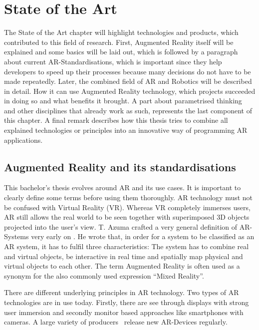 \chapter{State of the Art}\label{Chap:StateOfTheArt}

The State of the Art chapter will highlight technologies and products, which contributed to this field of research. First, Augmented Reality itself will be explained and some basics will be laid out, which is followed by a paragraph about current AR-Standardisations, which is important since they help developers to speed up their processes because many decisions do not have to be made repeatedly. Later, the combined field of AR and Robotics will be described in detail. How it can use Augmented Reality technology, which projects succeeded in doing so and what benefits it brought. A part about parametrised thinking and other disciplines that already work as such, represents the last component of this chapter. A final remark describes how this thesis tries to combine all explained technologies or principles into an innovative way of programming AR applications.

\section{Augmented Reality and its standardisations}

This bachelor's thesis evolves around AR and its use cases. It is important to clearly define some terms before using them thoroughly. AR technology must not be confused with Virtual Reality (VR). Whereas VR completely immerses users, AR still allows the real world to be seen together with superimposed 3D objects projected into the user's view. T. Azuma crafted a very general definition of AR-Systems very early on \cite{azuma1997survey}. He wrote that, in order for a system to be classified as an AR system, it has to fulfil three characteristics: The system has to combine real and virtual objects, be interactive in real time and spatially map physical and virtual objects to each other. The term Augmented Reality is often used as a synonym for the also commonly used expression “Mixed Reality”. 

There are different underlying principles in AR technology. Two types of AR technologies are in use today. Firstly, there are see through displays with strong user immersion and secondly monitor based approaches like smartphones with cameras. A large variety of producers~\cite{ARProudcersVariety} release new AR-Devices regularly.

